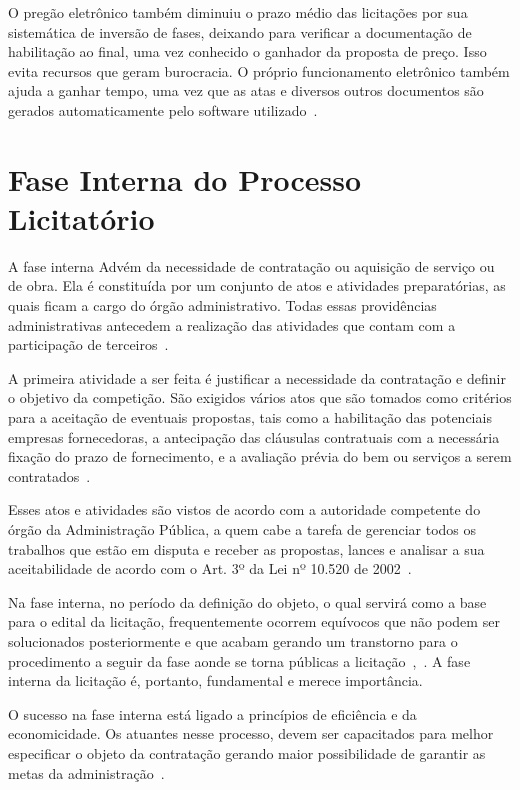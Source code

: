 O pregão eletrônico também diminuiu o prazo médio das licitações por sua sistemática de inversão de fases, deixando para verificar a documentação de habilitação ao final, uma vez conhecido o ganhador da proposta de preço.
Isso evita recursos que geram burocracia. 
O próprio funcionamento eletrônico também ajuda a ganhar tempo, uma vez que as atas e diversos outros documentos são gerados automaticamente pelo software utilizado~\cite{mello2016licitaccao}. 


\chapter[Fase Interna do Processo Licitatório]{Fase Interna do Processo Licitatório}\label{Capitulo2}

A fase interna Advém da necessidade de contratação ou aquisição de serviço ou de obra.
Ela é constituída por um conjunto de atos e atividades preparatórias, as quais ficam a cargo do órgão administrativo.
Todas essas providências administrativas antecedem a realização das atividades que contam com a participação de terceiros~\cite{meirelles2011direito}.

A primeira atividade a ser feita é justificar a necessidade da contratação e definir o objetivo da competição.
São exigidos vários atos que são tomados como critérios para a aceitação de eventuais propostas, tais como a habilitação das potenciais empresas fornecedoras, a antecipação das cláusulas contratuais com a necessária fixação do prazo de fornecimento, e a avaliação prévia do bem ou serviços a serem contratados~\cite{carvalho2013manual}.

Esses atos e atividades são vistos de acordo com a autoridade competente do órgão da Administração Pública, a quem cabe a tarefa de gerenciar todos os trabalhos que estão em disputa e receber as propostas, lances e analisar a sua aceitabilidade de acordo com o Art. 3º da Lei nº 10.520 de 2002~\cite{fernandes2005politicas}.

Na fase interna, no período da definição do objeto, o qual servirá como a base para o edital da licitação, frequentemente ocorrem equívocos que não podem ser solucionados posteriormente e que acabam gerando um transtorno para o procedimento a seguir da fase aonde se torna públicas a licitação~\cite{camarao2017fase},~\cite{de2007curso}. 
A fase interna da licitação é, portanto, fundamental e merece importância.

O sucesso na fase interna está ligado a princípios de eficiência e da economicidade.
Os atuantes nesse processo, devem ser capacitados para melhor especificar o objeto da contratação gerando maior possibilidade de garantir as metas da administração~\cite{camarao2017fase}.